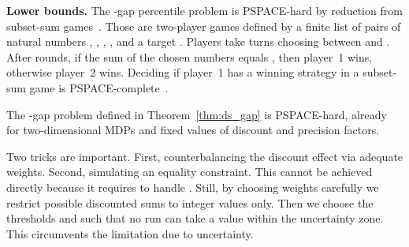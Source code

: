 \documentclass{llncs}
\newcommand\PSPACE{\textrm{\sf PSPACE}}
\begin{document}
\smallskip\noindent\textbf{Lower bounds.} The -gap percentile problem is \PSPACE-hard by reduction from subset-sum games~\cite{DBLP:journals/tcs/Travers06}. Those are two-player games defined by a finite list of pairs of natural numbers , , , , and a target . Players take turns choosing between  and . After  rounds, if the sum of the chosen numbers equals , then player~1 wins, otherwise player~2 wins. Deciding if player~1 has a winning strategy in a subset-sum game is \PSPACE-complete~\cite{DBLP:journals/tcs/Travers06}. 



\begin{lemma}
\label{lem:ds_pspace_hard}
The -gap problem defined in Theorem~\ref{thm:ds_gap} is \PSPACE-hard, already for two-dimensional MDPs and fixed values of discount and precision factors.
\end{lemma}

Two tricks are important. First, counterbalancing the discount effect via adequate weights. Second, simulating an equality constraint. This cannot be achieved directly because it requires to handle . Still, by choosing weights carefully we restrict possible discounted sums to integer values only. Then we choose the thresholds and  such that no run can take a value within the uncertainty zone. This circumvents the limitation due to uncertainty.
\end{document}
